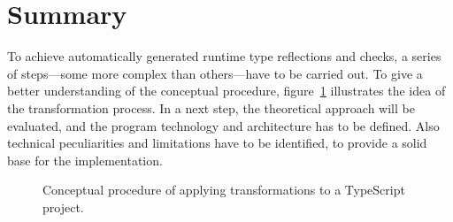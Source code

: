 \section{Summary}

To achieve automatically generated runtime type reflections and checks, a series of steps---some more complex than others---have to be carried out. To give a better understanding of the conceptual procedure, figure~\ref{fig:theoretical-approach} illustrates the idea of the transformation process. In a next step, the theoretical approach will be evaluated, and the program technology and architecture has to be defined. Also technical peculiarities and limitations have to be identified, to provide a solid base for the implementation.
\begin{figure}
\centering

\caption{Conceptual procedure of applying transformations to a TypeScript project.}
\label{fig:theoretical-approach}
\end{figure}


%





